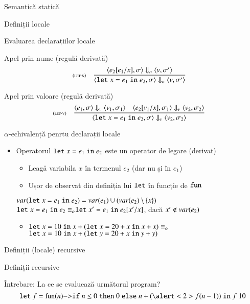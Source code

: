 \begin{section}{Semantică statică}
\begin{subsection}{Definiții locale}
\begin{frame}{Evaluarea declarațiilor locale}
\begin{block}{Apel prin nume (regulă derivată)}
\[\reg[let-n]{\c{\Slet x = e_1 \Sin e_2,\sigma}\Downarrow_n\c{v,\sigma'}}
{\c{e_2[e_1/x],\sigma}\Downarrow_n\c{v,\sigma'}}{}\]
\end{block}

\vfill
\begin{block}{Apel prin valoare (regulă derivată)}
\[\reg[let-v]{\c{\Slet x = e_1 \Sin e_2,\sigma}\Downarrow_v\c{v_2,\sigma_2}}
{\c{e_1,\sigma}\Downarrow_v\c{v_1,\sigma_1} \si \c{e_2[v_1/x],\sigma_1}\Downarrow_v\c{v_2,\sigma_2}}{}\]
\end{block}
\end{frame}

\begin{frame}{$\alpha$-echivalență penrtu declarații locale}
\begin{itemize}
\item Operatorul $\mathrel{\text{\ttfamily let}} x = e_1 \mathrel{\text{\ttfamily in}} e_2$ este un operator de legare (derivat)
\begin{itemize}
\item Leagă variabila $x$ în termenul $e_2$  (dar nu și în $e_1$)
\item Ușor de observat din definiția lui $\mathrel{\text{\ttfamily let}}$ în funcție de $\mathrel{\text{\ttfamily fun}}$
\end{itemize}
\vitem $\mathop{var}(\mathrel{\text{\ttfamily let}} x = e_1 \mathrel{\text{\ttfamily in}} e_2) = \mathop{var}(e_1) \cup (\mathop{var}(e_2) \setminus \{x\})$
\vitem $\mathrel{\text{\ttfamily let}} x = e_1 \mathrel{\text{\ttfamily in}} e_2 \equiv_\alpha \mathrel{\text{\ttfamily let}} x' = e_1 \mathrel{\text{\ttfamily in}} e_2[x'/x]$, dacă $x'\not\in\mathop{var}(e_2)$
\begin{itemize}
\item $\mathrel{\text{\ttfamily let}} x = 10 \mathrel{\text{\ttfamily in}}
   x + (\mathrel{\text{\ttfamily let}} x = 20 + x \mathrel{\text{\ttfamily in}} 
          x + x) \equiv_\alpha$\\$\mathrel{\text{\ttfamily let}} x = 10 \mathrel{\text{\ttfamily in}}
   x + (\mathrel{\text{\ttfamily let}} y = 20 + x \mathrel{\text{\ttfamily in}} 
          y + y)$
\end{itemize}
\end{itemize}
\end{frame}
\end{subsection}
\begin{subsection}{Definiții (locale) recursive}

\begin{frame}{Definiții recursive }
\begin{block}{Întrebare: La ce se evaluează următorul program?}
\[\Slet f = \fun{n}{\Sif n \leq 0 \Sthen 0 \Selse n + (\alert<2>{f} (n - 1))} \Sin f\; 10\] 
\end{block}


\end{frame}
\end{subsection}
\end{section}
